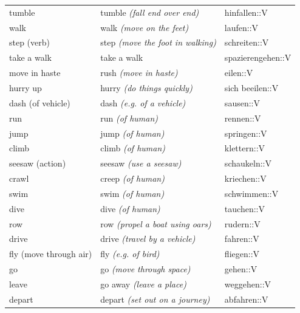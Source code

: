 \begin{center}
\begin{longtable}{lll}
{\sc \lowercase{	TUMBLE	}}	&	tumble	\textit{\footnotesize (fall end over end)}	&	hinfallen::V	\\
{\sc \lowercase{	WALK	}}	&	walk	\textit{\footnotesize (move on the feet)}	&	laufen::V	\\
{\sc \lowercase{	STEP \footnotesize (VERB)	}}	&	step	\textit{\footnotesize (move the foot in walking)}	&	schreiten::V	\\
{\sc \lowercase{	TAKE A WALK	}}	&	take a walk		&	spazierengehen::V	\\
{\sc \lowercase{	MOVE IN HASTE	}}	&	rush	\textit{\footnotesize (move in haste)}	&	eilen::V	\\
{\sc \lowercase{	HURRY UP	}}	&	hurry	\textit{\footnotesize (do things quickly)}	&	sich beeilen::V	\\
{\sc \lowercase{	DASH \footnotesize (OF VEHICLE)	}}	&	dash	\textit{\footnotesize (e.g. of a vehicle)}	&	sausen::V	\\
{\sc \lowercase{	RUN	}}	&	run	\textit{\footnotesize (of human)}	&	rennen::V	\\
{\sc \lowercase{	JUMP	}}	&	jump	\textit{\footnotesize (of human)}	&	springen::V	\\
{\sc \lowercase{	CLIMB	}}	&	climb	\textit{\footnotesize (of human)}	&	klettern::V	\\
{\sc \lowercase{	SEESAW \footnotesize (ACTION)	}}	&	seesaw	\textit{\footnotesize (use a seesaw)}	&	schaukeln::V	\\
{\sc \lowercase{	CRAWL	}}	&	creep	\textit{\footnotesize (of human)}	&	kriechen::V	\\
{\sc \lowercase{	SWIM	}}	&	swim	\textit{\footnotesize (of human)}	&	schwimmen::V	\\
{\sc \lowercase{	DIVE	}}	&	dive	\textit{\footnotesize (of human)}	&	tauchen::V	\\
{\sc \lowercase{	ROW	}}	&	row	\textit{\footnotesize (propel a boat using oars)}	&	rudern::V	\\
{\sc \lowercase{	DRIVE	}}	&	drive	\textit{\footnotesize (travel by a vehicle)}	&	fahren::V	\\
{\sc \lowercase{	FLY \footnotesize (MOVE THROUGH AIR)	}}	&	fly	\textit{\footnotesize (e.g. of bird)}	&	fliegen::V	\\
{\sc \lowercase{	GO	}}	&	go	\textit{\footnotesize (move through space)}	&	gehen::V	\\
{\sc \lowercase{	LEAVE	}}	&	go away	\textit{\footnotesize (leave a place)}	&	weggehen::V	\\
{\sc \lowercase{	DEPART	}}	&	depart	\textit{\footnotesize (set out on a journey)}	&	abfahren::V	\\

\end{longtable}
\end{center}
